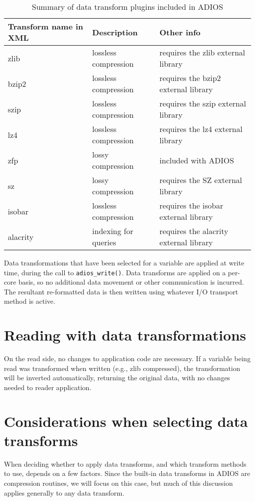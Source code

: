 \begin{table}%
\center
\begin{tabular}{l|l|l}
\textbf{Transform name in XML} & \textbf{Description} & \textbf{Other info} \\
\hline
zlib & lossless compression & requires the zlib external library \\
\hline
bzip2 & lossless compression & requires the bzip2 external library \\
\hline
szip & lossless compression & requires the szip external library \\
\hline
lz4 & lossless compression & requires the lz4 external library \\
\hline
zfp & lossy compression & included with ADIOS \\
\hline
sz & lossy compression & requires the SZ external library \\
\hline
isobar & lossless compression & requires the isobar external library \\
\hline
alacrity & indexing for queries & requires the alacrity external library \\
\end{tabular}
\caption{Summary of data transform plugins included in ADIOS}
\label{tbl:data-transforms-summary}
\end{table}

Data transformations that have been selected for a variable are applied at write time, during the call to \verb+adios_write()+.
Data transforms are applied on a per-core basis, so no additional data movement or other communication is incurred.
The resultant re-formatted data is then written using whatever I/O transport method is active.

\section{Reading with data transformations}
On the read side, no changes to application code are necessary. If a variable being read was transformed when written
(e.g., zlib compressed), the transformation will be inverted automatically, returning the original data,
with no changes needed to reader application.

\section{Considerations when selecting data transforms}
When deciding whether to apply data transforms, and which transform methods to use, depends on a few factors.
Since the built-in data transforms in ADIOS are compression routines, we will focus on this case, but much of
this discussion applies generally to any data transform.

